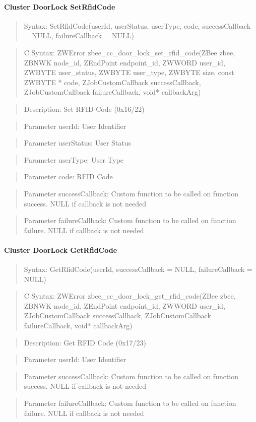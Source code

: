 \paragraph{Cluster DoorLock SetRfidCode}
\begin{quote}Syntax: SetRfidCode(userId, userStatus, userType, code, successCallback = NULL, failureCallback = NULL)\end{quote}
\begin{quote}C Syntax: ZWError zbee\_cc\_door\_lock\_set\_rfid\_code(ZBee zbee, ZBNWK node\_id, ZEndPoint endpoint\_id, ZWWORD user\_id, ZWBYTE user\_status, ZWBYTE user\_type, ZWBYTE size, const ZWBYTE * code, ZJobCustomCallback successCallback, ZJobCustomCallback failureCallback, void* callbackArg)\end{quote}
\begin{quote}Description: Set RFID Code (0x16/22)\end{quote}
\begin{quote}Parameter userId: User Identifier\end{quote}
\begin{quote}Parameter userStatus: User Status\end{quote}
\begin{quote}Parameter userType: User Type\end{quote}
\begin{quote}Parameter code: RFID Code\end{quote}
\begin{quote}Parameter successCallback: Custom function to be called on function success. NULL if callback is not needed\end{quote}
\begin{quote}Parameter failureCallback: Custom function to be called on function failure. NULL if callback is not needed\end{quote}


\paragraph{Cluster DoorLock GetRfidCode}
\begin{quote}Syntax: GetRfidCode(userId, successCallback = NULL, failureCallback = NULL)\end{quote}
\begin{quote}C Syntax: ZWError zbee\_cc\_door\_lock\_get\_rfid\_code(ZBee zbee, ZBNWK node\_id, ZEndPoint endpoint\_id, ZWWORD user\_id, ZJobCustomCallback successCallback, ZJobCustomCallback failureCallback, void* callbackArg)\end{quote}
\begin{quote}Description: Get RFID Code (0x17/23)\end{quote}
\begin{quote}Parameter userId: User Identifier\end{quote}
\begin{quote}Parameter successCallback: Custom function to be called on function success. NULL if callback is not needed\end{quote}
\begin{quote}Parameter failureCallback: Custom function to be called on function failure. NULL if callback is not needed\end{quote}


